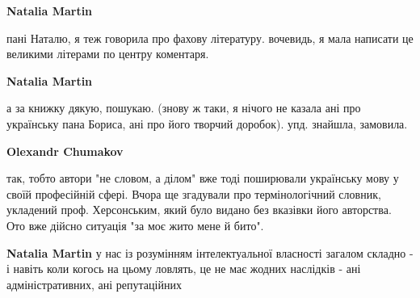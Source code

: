 \begin{itemize}
\begin{itemize}
 
\textbf{Natalia Martin} 

пані Наталю, я теж говорила про фахову літературу. вочевидь, я мала написати це
великими літерами по центру коментаря.


 
\textbf{Natalia Martin} 

а за книжку дякую, пошукаю. (знову ж таки, я нічого не казала ані про
українську пана Бориса, ані про його творчий доробок). упд. знайшла, замовила.


 
\textbf{Olexandr Chumakov} 

так, тобто автори "не словом, а ділом" вже тоді поширювали українську мову у
своїй професійній сфері. Вчора ще згадували про термінологічний словник,
укладений проф. Херсонським, який було видано без вказівки його авторства. Ото
вже дійсно ситуація "за моє жито мене й бито".

 
\textbf{Natalia Martin} у нас із розумінням інтелектуальної власності загалом складно - і навіть коли когось на цьому ловлять, це не має жодних наслідків - ані адміністративних, ані репутаційних 🙁

 

\end{itemize}
\end{itemize}
